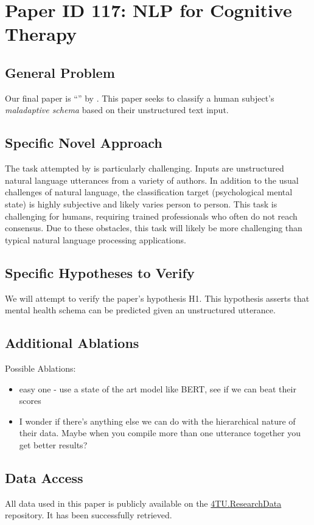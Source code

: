 \documentclass[11pt,a4paper]{article}
\begin{document}
{\section{Paper ID 117: NLP for Cognitive Therapy}
\subsection{General Problem}
Our final paper is ``'' by \citeauthor*{burger_2021}. This paper seeks to classify a human subject's \emph{maladaptive schema} based on their unstructured text input. 

\subsection{Specific Novel Approach}
The task attempted by \citet{burger_2021} is particularly challenging. Inputs are unstructured natural language utterances from a variety of authors. In addition to the usual challenges of natural language, the classification target (psychological mental state) is highly subjective and likely varies person to person. This task is challenging for humans, requiring trained professionals who often do not reach consensus. Due to these obstacles, this task will likely be more challenging than typical natural language processing applications. 

\subsection{Specific Hypotheses to Verify}
We will attempt to verify the paper's hypothesis H1. This hypothesis asserts that mental health schema can be predicted given an unstructured utterance. 

\subsection{Additional Ablations}
Possible Ablations:
\begin{itemize}
  \item easy one - use a state of the art model like BERT, see if we can beat their scores 
  \item I wonder if there's anything else we can do with the hierarchical nature of their data. Maybe when you compile more than one utterance together you get better results?
\end{itemize}

\subsection{Data Access}
All data used in this paper is publicly available on the \href{https://data.4tu.nl/info/en/about-4turesearchdata/organisation}{4TU.ResearchData} repository. It has been successfully retrieved. 

}
\end{document}
